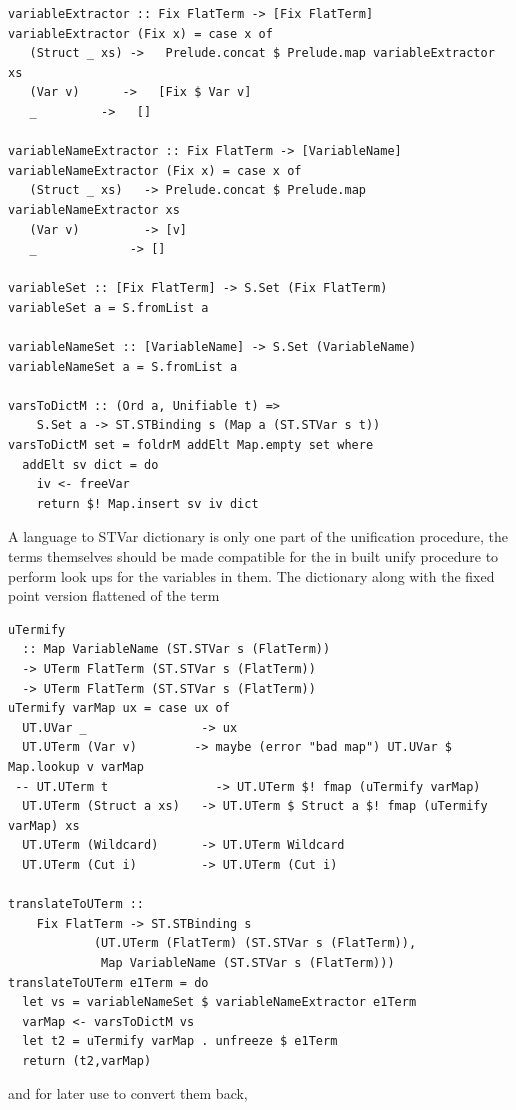 \documentclass[thesis-solanki.tex]{subfiles}
\begin{document}
\begin{verbatim}
variableExtractor :: Fix FlatTerm -> [Fix FlatTerm]
variableExtractor (Fix x) = case x of
   (Struct _ xs) ->   Prelude.concat $ Prelude.map variableExtractor xs
   (Var v)      ->   [Fix $ Var v]
   _         ->   [] 

variableNameExtractor :: Fix FlatTerm -> [VariableName]
variableNameExtractor (Fix x) = case x of
   (Struct _ xs)   -> Prelude.concat $ Prelude.map variableNameExtractor xs
   (Var v)         -> [v]
   _             -> []   

variableSet :: [Fix FlatTerm] -> S.Set (Fix FlatTerm)
variableSet a = S.fromList a

variableNameSet :: [VariableName] -> S.Set (VariableName)
variableNameSet a = S.fromList a

varsToDictM :: (Ord a, Unifiable t) =>
    S.Set a -> ST.STBinding s (Map a (ST.STVar s t))
varsToDictM set = foldrM addElt Map.empty set where
  addElt sv dict = do
    iv <- freeVar
    return $! Map.insert sv iv dict
\end{verbatim}

A language to STVar dictionary is only one part of the unification procedure, the terms themselves should be made compatible for the in 
built unify procedure to perform look ups for the variables in them. The dictionary along with the fixed point version flattened of the term


\begin{verbatim}
uTermify 
  :: Map VariableName (ST.STVar s (FlatTerm)) 
  -> UTerm FlatTerm (ST.STVar s (FlatTerm)) 
  -> UTerm FlatTerm (ST.STVar s (FlatTerm))
uTermify varMap ux = case ux of
  UT.UVar _                -> ux
  UT.UTerm (Var v)        -> maybe (error "bad map") UT.UVar $ Map.lookup v varMap
 -- UT.UTerm t               -> UT.UTerm $! fmap (uTermify varMap) 
  UT.UTerm (Struct a xs)   -> UT.UTerm $ Struct a $! fmap (uTermify varMap) xs     
  UT.UTerm (Wildcard)      -> UT.UTerm Wildcard
  UT.UTerm (Cut i)         -> UT.UTerm (Cut i)

translateToUTerm ::
    Fix FlatTerm -> ST.STBinding s
            (UT.UTerm (FlatTerm) (ST.STVar s (FlatTerm)),
             Map VariableName (ST.STVar s (FlatTerm)))
translateToUTerm e1Term = do
  let vs = variableNameSet $ variableNameExtractor e1Term
  varMap <- varsToDictM vs
  let t2 = uTermify varMap . unfreeze $ e1Term
  return (t2,varMap)
\end{verbatim}

and for later use to convert them back,
\end{document}
